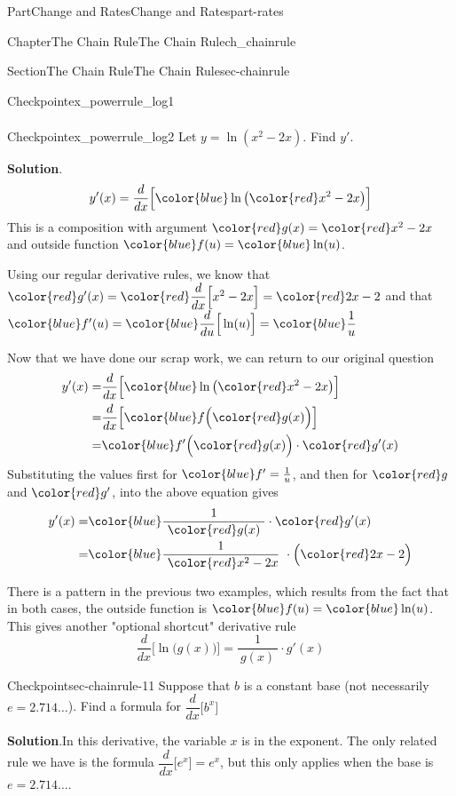 \documentclass[oneside,10pt,]{tufte-book}
\newcommand{\blocktitlefont}{\relax}
\numberwithin{equation}{chapter}
\newcommand{\red}[1]{   {\color{red}   #1}   }
\newcommand{\blue}[1]{  {\color{blue}  #1}  }
\newcommand{\ddx}[1]{ \dfrac{d}{dx} \Big[ #1 \Big]  }
\newcommand{\ddu}[1]{ \dfrac{d}{du} \Big[ #1 \Big]  }
\newcommand{\amp}{&}
\begin{document}
\begin{partptx}{Part}{Change and Rates}{}{Change and Rates}{}{}{part-rates}
\begin{chapterptx}{Chapter}{The Chain Rule}{}{The Chain Rule}{}{}{ch_chainrule}
\begin{sectionptx}{Section}{The Chain Rule}{}{The Chain Rule}{}{}{sec-chainrule}
\begin{inlineexercise}{Checkpoint}{}{ex_powerrule_log1}
\begin{align*}
\end{align*}
%
\end{inlineexercise}%
\begin{inlineexercise}{Checkpoint}{}{ex_powerrule_log2}%
Let \(y = \ln( x^2- 2x)\).  Find \(y'\).%
\par\smallskip%
\noindent\textbf{\blocktitlefont Solution}.\hypertarget{ex_powerrule_log2-2}{}\quad{}%
\begin{equation*}
y'(x) = \ddx{ \blue{ \ln\big( \red{x^2- 2x} \big) } }
\end{equation*}
This is a composition with argument \(\red{g(x)} = \red{x^2- 2x}\) and outside function \(\blue{f(u)} = \blue{ \ln(u) }\).%
\par
Using our regular derivative rules, we know that \(\red{g'(x)} 
= \red{ \ddx{x^2- 2x} } = \red{2x-2} \) and that \(\blue{f'(u)} 
= \blue{\ddu{ \ln(u) }} = \blue{\dfrac{1}{u}} \)%
\par
Now that we have done our scrap work, we can return to our original question%
\begin{align*}
y'(x) = \amp 
\ddx{\blue{ \ln\big(\red{x^2- 2x}\big) } }  \\
= \amp \ddx{ \blue{f\Big( \red{g(x)} \Big) } }\\
= \amp \blue{f'\Big( \red{g(x)}\Big)}\cdot \red{g'(x)}
\end{align*}
Substituting the values first for \(\blue{f'}= \frac{1}{u}\), and then for  \(\red{g}\) and \(\red{g'}\), into the above equation gives%
\begin{align*}
y'(x) = \amp 
\blue{ \frac{1}{\ \red{g(x)}\ } }\cdot \red{g'(x)}\\
= \amp 
\blue{ \frac{1}{\ \red{x^2- 2x}}\ }\cdot \Big(\red{2x-2}\Big)
\end{align*}
%
\end{inlineexercise}%
There is a pattern in the previous two examples, which results from the fact that in both cases, the outside function is \(\blue{f(u)} = \blue{\ln(u)}\).  This gives another "optional shortcut" derivative rule%
\begin{equation*}
\ddx{\ln\Big( g(x) \Big)} = \dfrac{1}{\ g(x)\ }\cdot g'(x)
\end{equation*}
%
\begin{inlineexercise}{Checkpoint}{}{sec-chainrule-11}%
Suppose that \(b\) is a constant base (not necessarily \(e=2.714\dots\)). Find a formula for \(\displaystyle\ddx{ b^x } \)%
\par\smallskip%
\noindent\textbf{\blocktitlefont Solution}.\hypertarget{sec-chainrule-11-2}{}\quad{}In this derivative, the variable \(x\) is in the exponent. The only related rule we have is the formula \(\ddx{e^x}=e^x\), but this only applies when the base is \(e=2.714\dots\).%

\end{inlineexercise}
\end{sectionptx}
\end{chapterptx}
\end{partptx}
\end{document}

